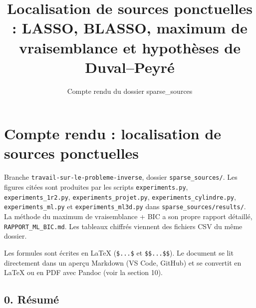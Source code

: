 \documentclass[
  french,
]{article}
\title{Localisation de sources ponctuelles : LASSO, BLASSO, maximum de
vraisemblance et hypothèses de Duval--Peyré}
\subtitle{Compte rendu du dossier sparse\_sources}
\author{}
\date{}
\begin{document}
\maketitle

\section{Compte rendu : localisation de sources
ponctuelles}\label{compte-rendu-localisation-de-sources-ponctuelles}

Branche \texttt{travail-sur-le-probleme-inverse}, dossier
\texttt{sparse\_sources/}. Les figures citées sont produites par les
scripts \texttt{experiments.py}, \texttt{experiments\_1r2.py},
\texttt{experiments\_projet.py}, \texttt{experiments\_cylindre.py},
\texttt{experiments\_ml.py} et \texttt{experiments\_ml3d.py} dans
\texttt{sparse\_sources/results/}. La méthode du maximum de
vraisemblance + BIC a son propre rapport détaillé,
\texttt{RAPPORT\_ML\_BIC.md}. Les tableaux chiffrés viennent des
fichiers CSV du même dossier.

Les formules sont écrites en LaTeX (\texttt{\$...\$} et
\texttt{\$\$...\$\$}). Le document se lit directement dans un aperçu
Markdown (VS Code, GitHub) et se convertit en LaTeX ou en PDF avec
Pandoc (voir la section 10).

\subsection{0. Résumé}\label{ruxe9sumuxe9}
\end{document}
